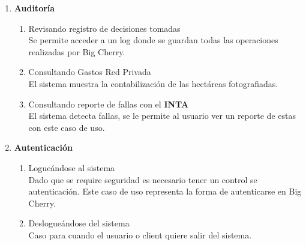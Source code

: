 \begin{enumerate}
 \item \textbf{Auditor\'ia}
 \begin{enumerate}
    \item Revisando registro de decisiones tomadas\\
	Se permite acceder a un log donde se guardan todas las operaciones realizadas por Big Cherry.
    \item Consultando Gastos Red Privada\\
     El sistema muestra la contabilizaci\'on de las hect\'areas fotografiadas.
    \item Consultando reporte de fallas con el \textbf{INTA}\\
     El sistema detecta fallas, se le permite al usuario ver un reporte de estas con este caso de uso.
 \end{enumerate}
 \item \textbf{Autenticaci\'on}
 \begin{enumerate}
    \item Logueándose al sistema\\
    Dado que se require seguridad es necesario tener un control se autenticaci\'on. Este caso de uso representa la forma de autenticarse en Big Cherry.
    \item Deslogueándose del sistema\\
    Caso para cuando el usuario o client quiere salir del sistema.
 \end{enumerate}
\end{enumerate}
